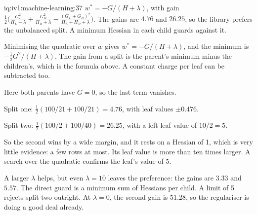 \begin{solution}{iq:iv1:machine-learning:37}
$w^* = -G/(H + \lambda)$, with gain $\frac12\bigl(\frac{G_L^2}{H_L + \lambda} + \frac{G_R^2}{H_R + \lambda} - \frac{(G_L + G_R)^2}{H_L + H_R + \lambda}\bigr)$. The gains are $4.76$ and $26.25$, so the library prefers the unbalanced split. A minimum Hessian in each child guards against it.

Minimising the quadratic over $w$ gives $w^* = -G/(H + \lambda)$, and the minimum is $-\frac12G^2/(H + \lambda)$. The gain from a split is the parent's minimum minus the children's, which is the formula above. A constant charge per leaf can be subtracted too.

Here both parents have $G = 0$, so the last term vanishes.

Split one: $\frac12(100/21 + 100/21) = 4.76$, with leaf values $\pm 0.476$.

Split two: $\frac12(100/2 + 100/40) = 26.25$, with a left leaf value of $10/2 = 5$.

So the second wins by a wide margin, and it rests on a Hessian of 1, which is very little evidence: a few rows at most. Its leaf value is more than ten times larger. A search over the quadratic confirms the leaf's value of 5.

A larger $\lambda$ helps, but even $\lambda = 10$ leaves the preference: the gains are $3.33$ and $5.57$. The direct guard is a minimum sum of Hessians per child. A limit of 5 rejects split two outright. At $\lambda = 0$, the second gain is $51.28$, so the regulariser is doing a good deal already.



\end{solution}

